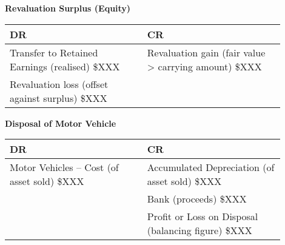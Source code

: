 \vspace{1cm}

\textbf{Revaluation Surplus (Equity)}\\[3pt]
\begin{tabular}{@{}p{0.45\linewidth} p{0.45\linewidth}@{}}
\textbf{DR} & \textbf{CR} \\ \midrule
Transfer to Retained Earnings (realised) \hfill \$XXX & Revaluation gain (fair value > carrying amount) \hfill \$XXX \\
Revaluation loss (offset against surplus) \hfill \$XXX & \\
\end{tabular}

\vspace{1cm}

\textbf{Disposal of Motor Vehicle}\\[3pt]
\begin{tabular}{@{}p{0.45\linewidth} p{0.45\linewidth}@{}}
\textbf{DR} & \textbf{CR} \\ \midrule
Motor Vehicles – Cost (of asset sold) \hfill \$XXX & Accumulated Depreciation (of asset sold) \hfill \$XXX \\
& Bank (proceeds) \hfill \$XXX \\
& Profit or Loss on Disposal (balancing figure) \hfill \$XXX \\
\end{tabular}
